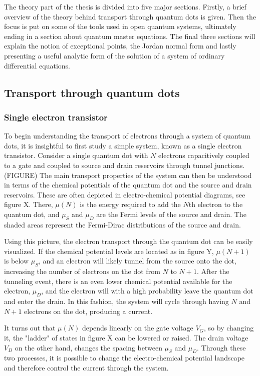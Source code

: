 \documentclass[../main.tex]{subfiles}
\begin{document}
The theory part of the thesis is divided into five major sections. Firstly, a brief overview of the theory behind transport through quantum dots is given. Then the focus is put on some of the tools used in open quantum systems, ultimately ending in a section about quantum master equations. The final three sections will explain the notion of exceptional points, the Jordan normal form and lastly presenting a useful analytic form of the solution of a system of ordinary differential equations.
\subsection{Transport through quantum dots}
\subsubsection{Single electron transistor}
To begin understanding the transport of electrons through a system of quantum dots, it is insightful to first study a simple system, known as a single electron transistor. Consider a single quantum dot with $N$ electrons capacitively coupled to a gate and coupled to source and drain reservoirs through tunnel junctions. (FIGURE) The main transport properties of the system can then be understood in terms of the chemical potentials of the quantum dot and the source and drain reservoirs. These are often depicted in electro-chemical potential diagrams, see figure X. There, $\mu(N)$ is the energy required to add the $N$th electron to the quantum dot, and $\mu_S$ and $\mu_D$ are the Fermi levels of the source and drain. The shaded areas represent the Fermi-Dirac distributions of the source and drain.
 
Using this picture, the electron transport through the quantum dot can be easily visualized. If the chemical potential levels are located as in figure Y, $\mu(N + 1)$ is below $\mu_S$, and an electron will likely tunnel from the source onto the dot, increasing the number of electrons on the dot from $N$ to $N+1$. After the tunneling event, there is an even lower chemical potential available for the electron, $\mu_D$, and the electron will with a high probability leave the quantum dot and enter the drain. In this fashion, the system will cycle through having $N$ and $N+1$ electrons on the dot, producing a current.  

It turns out that $\mu(N)$ depends linearly on the gate voltage $V_G$, so by changing it, the "ladder" of states in figure X can be lowered or raised. The drain voltage $V_D$ on the other hand, changes the spacing between $\mu_S$ and $\mu_D$. Through these two processes, it is possible to change the electro-chemical potential landscape and therefore control the current through the system. 
\end{document}
